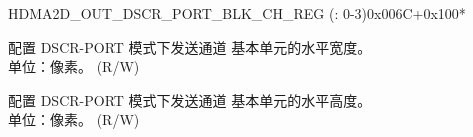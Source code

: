 \begin{register}{H}{DMA2D\_OUT\_DSCR\_PORT\_BLK\_CH\_REG (: 0-3)}{0x006C+0x100*}\label{regdesc:DMA2DOUTDSCRPORTBLKCHNREG}
%
%
%
\regnewline%
\begin{regdesc}\begin{reglist}
\label{fielddesc:DMA2DOUTDSCRPORTBLKHCHN}\item [DMA2D\_OUT\_DSCR\_PORT\_BLK\_H\_CH\regindex{n}] 配置 DSCR-PORT 模式下发送通道  基本单元的水平宽度。\\单位：像素。 (R/W)
\label{fielddesc:DMA2DOUTDSCRPORTBLKVCHN}\item [DMA2D\_OUT\_DSCR\_PORT\_BLK\_V\_CH\regindex{n}] 配置 DSCR-PORT 模式下发送通道  基本单元的水平高度。\\单位：像素。 (R/W)
\end{reglist}\end{regdesc}
\end{register}


